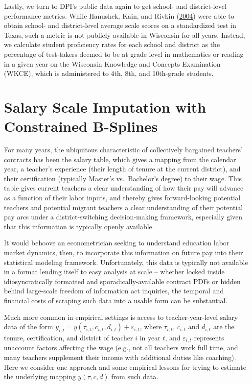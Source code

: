 \documentclass[12pt,]{article}
\begin{document}
Lastly, we turn to DPI's public data again to get school- and
district-level performance metrics. While Hanushek, Kain, and Rivkin
(\protect\hyperlink{ref-hanushek}{2004}) were able to obtain school- and
district-level average scale scores on a standardized test in Texas,
such a metric is not publicly available in Wisconsin for all years.
Instead, we calculate student proficiency rates for each school and
district as the percentage of test-takers deemed to be at grade level in
mathematics or reading in a given year on the Wisconsin Knowledge and
Concepts Examination (WKCE), which is administered to 4th, 8th, and
10th-grade students.

\section{Salary Scale Imputation with Constrained
B-Splines}\label{salary-scale-imputation-with-constrained-b-splines}

For many years, the ubiquitous characteristic of collectively bargained
teachers' contracts has been the salary table, which gives a mapping
from the calendar year, a teacher's experience (their length of tenure
at the current district), and their certification (typically Master's
vs.~Bachelor's degree) to their wage. This table gives current teachers
a clear understanding of how their pay will advance as a function of
their labor inputs, and thereby gives forward-looking potential teachers
and potential migrant teachers a clear understanding of their potential
pay arcs under a district-switching decision-making framework,
especially given that this information is typically openly available.

It would behoove an econometrician seeking to understand education labor
market dynamics, then, to incorporate this information on future pay
into their statistical modeling framework. Unfortunately, this data is
typically not available in a format lending itself to easy analysis at
scale -- whether locked inside idiosyncratically formatted and
sporadically-available contract PDFs or hidden behind large-scale
freedom of information act inquiries, the temporal and financial costs
of scraping such data into a usable form can be substantial.

Much more common in empirical settings is access to teacher-year-level
salary data of the form
\(y_{i, t} = y(\tau_{i, t}, c_{i, t}, d_{i, t}) + \varepsilon_{i, t}\),
where \(\tau_{i,t}\), \(c_{i, t}\) and \(d_{i, t}\) are the tenure,
certification, and district of teacher \(i\) in year \(t\), and
\(\varepsilon_{i, t}\) represents unaccount factors affecting the wage
(e.g., not all teachers work full time, and many teachers supplement
their income with additional duties like coaching). Here we consider one
approach and some empirical lessons for trying to estimate the
underlying mapping \(y(\tau, c, d)\) from such data.
\end{document}
